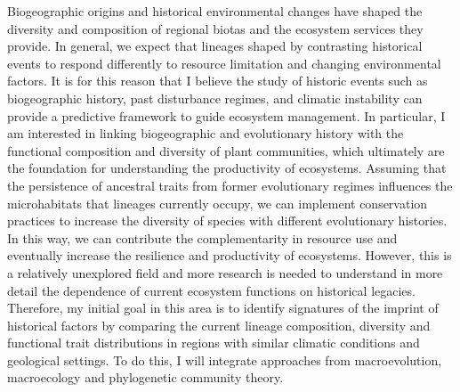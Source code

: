 \documentclass[svgnames,11pt,longbibliography,reqno]{article}
\begin{document}
Biogeographic origins and historical environmental changes have shaped the diversity and composition of regional biotas and the ecosystem services they provide. In general, we expect that lineages shaped by contrasting historical events to respond differently to resource limitation and changing environmental factors. It is for this reason that I believe the study of historic events such as biogeographic history, past disturbance regimes, and climatic instability can provide a predictive framework to guide ecosystem management. In particular, I am interested in linking biogeographic and evolutionary history with the functional composition and diversity of plant communities, which ultimately are the foundation for understanding the productivity of ecosystems. Assuming that the persistence of ancestral traits from former evolutionary regimes influences the microhabitats that lineages currently occupy, we can implement conservation practices to increase the diversity of species with different evolutionary histories. In this way, we can contribute the complementarity in resource use and eventually increase the resilience and productivity of ecosystems. However, this is a relatively unexplored field and more research is needed to understand in more detail the dependence of current ecosystem functions on historical legacies. Therefore, my initial goal in this area is to identify signatures of the imprint of historical factors by comparing the current lineage composition, diversity and functional trait distributions in regions with similar climatic conditions and geological settings. To do this, I will integrate approaches from macroevolution, macroecology and phylogenetic community theory. 


\vspace{\baselineskip}

\small 
\end{document}
